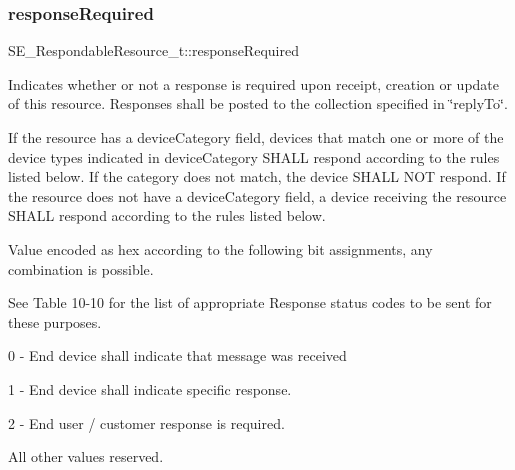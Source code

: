 \subsubsection{\texorpdfstring{response\+Required}{responseRequired}}
{\footnotesize\ttfamily S\+E\+\_\+\+Respondable\+Resource\+\_\+t\+::response\+Required}

Indicates whether or not a response is required upon receipt, creation or update of this resource. Responses shall be posted to the collection specified in \char`\"{}reply\+To\char`\"{}.

If the resource has a device\+Category field, devices that match one or more of the device types indicated in device\+Category S\+H\+A\+LL respond according to the rules listed below. If the category does not match, the device S\+H\+A\+LL N\+OT respond. If the resource does not have a device\+Category field, a device receiving the resource S\+H\+A\+LL respond according to the rules listed below.

Value encoded as hex according to the following bit assignments, any combination is possible.

See Table 10-\/10 for the list of appropriate Response status codes to be sent for these purposes.

0 -\/ End device shall indicate that message was received

1 -\/ End device shall indicate specific response.

2 -\/ End user / customer response is required.

All other values reserved. 